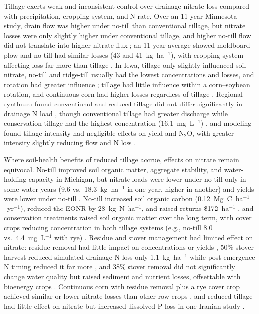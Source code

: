 \documentclass[11pt]{article}
\begin{document}
Tillage exerts weak and inconsistent control over drainage nitrate loss compared with precipitation, cropping system, and N rate. Over an 11-year Minnesota study, drain flow was higher under no-till than conventional tillage, but nitrate losses were only slightly higher under conventional tillage, and higher no-till flow did not translate into higher nitrate flux \parencite{RANDALL1995}; an 11-year average showed moldboard plow and no-till had similar losses (43 and 41~kg~ha$^{-1}$), with cropping system affecting loss far more than tillage \parencite{Randall2001}. In Iowa, tillage only slightly influenced soil nitrate, no-till and ridge-till usually had the lowest concentrations and losses, and rotation had greater influence \parencite{Weed1996}; tillage had little influence within a corn--soybean rotation, and continuous corn had higher losses regardless of tillage \parencite{Kanwar1997}. Regional syntheses found conventional and reduced tillage did not differ significantly in drainage N load \parencite{Zhao2016}, though conventional tillage had greater discharge while conservation tillage had the highest concentration (16.1~mg~L$^{-1}$) \parencite{Hertzberger2019}, and modeling found tillage intensity had negligible effects on yield and N$_2$O, with greater intensity slightly reducing flow and N loss \parencite{Wang2016b}.

Where soil-health benefits of reduced tillage accrue, effects on nitrate remain equivocal. No-till improved soil organic matter, aggregate stability, and water-holding capacity in Michigan, but nitrate loads were lower under no-till only in some water years (9.6 vs.\ 18.3~kg~ha$^{-1}$ in one year, higher in another) and yields were lower under no-till \parencite{Masri2024}. No-till increased soil organic carbon (0.12~Mg~C~ha$^{-1}$~yr$^{-1}$), reduced the EONR by 28~kg~N~ha$^{-1}$, and raised returns \$172~ha$^{-1}$ \parencite{Cassman2025}, and conservation treatments raised soil organic matter over the long term, with cover crops reducing concentration in both tillage systems (e.g., no-till 8.0 vs.\ 4.4~mg~L$^{-1}$ with rye) \parencite{Waring2024}. Residue and stover management had limited effect on nitrate: residue removal had little impact on concentrations or yields \parencite{Dougherty2020}, 50\% stover harvest reduced simulated drainage N loss only 1.1~kg~ha$^{-1}$ while post-emergence N timing reduced it far more \parencite{Malone2019}, and 38\% stover removal did not significantly change water quality but raised sediment and nutrient losses, offsettable with bioenergy crops \parencite{Guo2018}. Continuous corn with residue removal plus a rye cover crop achieved similar or lower nitrate losses than other row crops \parencite{Daigh2015b}, and reduced tillage had little effect on nitrate but increased dissolved-P loss in one Iranian study \parencite{Farahani2020}.
\end{document}
